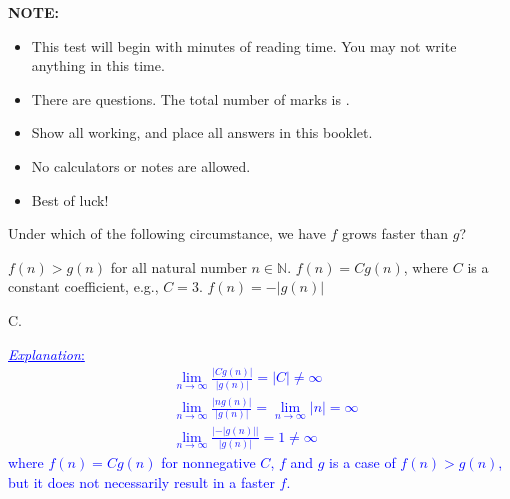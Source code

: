 \documentclass[addpoints,12pt]{exam}
\newcommand{\mycorrectchoice}[1]{\CorrectChoice \fbox{#1}}
\newcommand{\mycorrectchoice}[1]{\CorrectChoice #1}
\newcommand{\Exp}[1]{\textcolor{blue}{\underline{\emph{Explanation}:} #1}}
\begin{document}
\qquad
{\fontsize{12}{12}\selectfont
 \textbf{NOTE:}
    \begin{itemize}
    \setlength{\leftskip}{40pt}
      \item This test will begin with  minutes of reading time. You may not write anything in this time.
      \item There are \fbox{\numquestions} questions. The total number of marks is \fbox{\numpoints}.
      \item Show all working, and place all answers in this booklet.
      \item No calculators or notes are allowed.
      \item Best of luck!
    \end{itemize}
 \setlength{\leftskip}{0pt}

 \vfill
 \begin{center}\gradetable[h][questions]\end{center}

\newpage


\begin{questions}

\label{first_page}

\question[1] Under which of the following circumstance, we have $f$ grows faster than $g$?
\vspace{10pt}
\begin{choices}
    \choice $f(n) > g(n)$ for all natural number $n \in \mathbb{N}$.
    \choice $f(n) = C g(n)$, where $C$ is a constant coefficient, e.g., $C = 3$.
    \mycorrectchoice{$f(n) = n g(n)$}
    \choice $f(n) = - |g(n)|$
\end{choices}
\begin{solution}
    C.

    \Exp{
        \begin{align}
            & \lim_{n \to \infty} \frac{|Cg(n)|}{|g(n)|} = |C| \neq \infty \\
            & \lim_{n \to \infty} \frac{|n g(n)|}{|g(n)|} = \lim_{n \to \infty} |n| =  \infty \\
            & \lim_{n \to \infty} \frac{|-|g(n)||}{|g(n)|} = 1 \neq \infty
        \end{align}
    where $f(n) = Cg(n)$ for nonnegative $C$, $f$ and $g$ is a case of $f(n) > g(n)$, but it does not necessarily result in a faster $f$.
     }
\end{solution}

\vspace{20pt}


\end{questions}}
\end{document}
